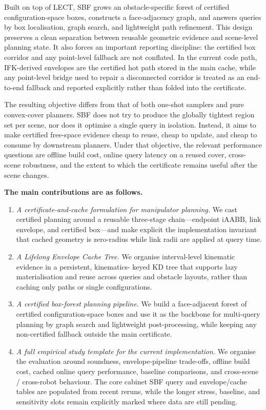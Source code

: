 \documentclass[journal]{IEEEtran}
\newcommand{\iAABB}{\ensuremath{\mathrm{iAABB}}}
\begin{document}
Built on top of LECT, SBF grows an obstacle-specific forest of certified
configuration-space boxes, constructs a face-adjacency graph, and answers
queries by box localisation, graph search, and lightweight path refinement.
This design preserves a clean separation between reusable geometric evidence and
scene-level planning state. It also forces an important reporting discipline:
the certified box corridor and any point-level fallback are not conflated. In
the current code path, IFK-derived envelopes are the certified hot path stored
in the main cache, while any point-level bridge used to repair a disconnected
corridor is treated as an end-to-end fallback and reported explicitly rather
than folded into the certificate.

The resulting objective differs from that of both one-shot samplers and pure
convex-cover planners. SBF does not try to produce the globally tightest region
set per scene, nor does it optimise a single query in isolation. Instead, it
aims to make certified free-space evidence cheap to reuse, cheap to update, and
cheap to consume by downstream planners. Under that objective, the relevant
performance questions are offline build cost, online query latency on a reused
cover, cross-scene robustness, and the extent to which the certificate remains
useful after the scene changes.

\textbf{The main contributions are as follows.}
\begin{enumerate}[nosep]
  \item \emph{A certificate-and-cache formulation for manipulator planning.}
  We cast certified planning around a reusable three-stage chain---endpoint
    \iAABB, link envelope, and certified box---and make explicit the implementation
    invariant that cached geometry is zero-radius while link radii are applied at
    query time.

  \item \emph{A Lifelong Envelope Cache Tree.}
  We organise interval-level kinematic evidence in a persistent, kinematics-
  keyed KD tree that supports lazy materialisation and reuse across queries and
  obstacle layouts, rather than caching only paths or single configurations.

  \item \emph{A certified box-forest planning pipeline.}
  We build a face-adjacent forest of certified configuration-space boxes and use
  it as the backbone for multi-query planning by graph search and lightweight
  post-processing, while keeping any non-certified fallback outside the main
  certificate.

  \item \emph{A full empirical study template for the current implementation.}
  We organise the evaluation around soundness, envelope-pipeline trade-offs,
  offline build cost, cached online query performance, baseline comparisons,
  and cross-scene / cross-robot behaviour. The core cabinet SBF query and
  envelope/cache tables are populated from recent reruns, while the
  longer stress, baseline, and sensitivity slots remain explicitly marked where
  data are still pending.
\end{enumerate}
\end{document}
